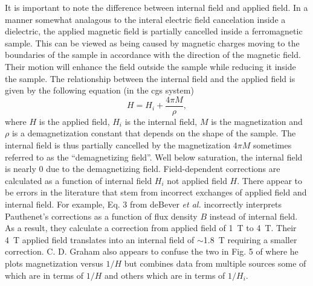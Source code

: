 \documentclass[12pt]{article}
\begin{document}
It is important to note the difference between internal field and applied field. In a manner somewhat analagous to the interal electric field cancelation inside a dielectric, the applied magnetic field is partially cancelled inside a ferromagnetic sample. This can be viewed as being caused by magnetic charges moving to the boundaries of the sample in accordance with the direction of the magnetic field. Their motion will enhance the field outside the sample while reducing it inside the sample. The relationship between the internal field and the applied field is given by the following equation (in the cgs system)
\begin{equation}
H=H_i+\frac{4\pi M}{\rho},
\end{equation}
where $H$ is the applied field, $H_i$ is the internal field, $M$ is the magnetization and $\rho$ is a demagnetization constant that depends on the shape of the sample. The internal field is thus partially cancelled by the magnetization $4\pi M$ sometimes referred to as the ``demagnetizing field''. Well below saturation, the internal field is nearly 0 due to the demagnetizing field. Field-dependent corrections are calculated as a function of internal field $H_i$ not applied field $H$. There appear to be errors in the literature that stem from incorrect exchanges of applied field and internal field. For example, Eq. 3 from deBever {\it et al.} incorrectly interprets Pauthenet's corrections as a function of flux density $B$ instead of internal field. As a result, they calculate a correction from applied field of 1~T to 4~T. Their 4~T applied field translates into an internal field of $\sim$1.8~T requiring a smaller correction. C. D. Graham also appears to confuse the two in Fig. 5  of \cite{Graham1982} where he plots magnetization versus $1/H$ but combines data from multiple sources some of which are in terms of $1/H$ and others which are in terms of $1/H_i$.  
\end{document}
